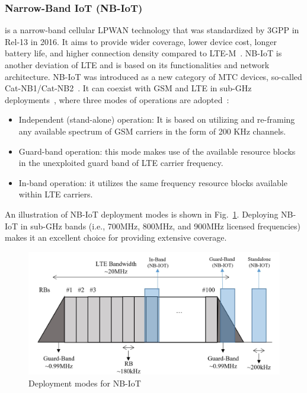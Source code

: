 \documentclass[]{IEEEtran}
\begin{document}
\subsubsection{Narrow-Band IoT (NB-IoT)}
\label{sec:2-2-1}
is a narrow-band cellular LPWAN technology that was standardized by 3GPP in Rel-13 in 2016\cite{TR_45.820}.
It aims to provide wider coverage, lower device cost, longer battery life, and higher connection density compared to LTE-M~\cite{ding_iot_2020}.
NB-IoT is another deviation of LTE and is based on its functionalities and network architecture.
NB-IoT was introduced as a new category of MTC devices, so-called Cat-NB1/Cat-NB2~\cite{liberg_cellular_2019}.
It can coexist with GSM and LTE in sub-GHz deployments~\cite{chaudhari2020lpwan}, where three modes of operations are adopted~\cite{chen2017narrow,chettri_comprehensive_2020_1}:
 \begin{itemize}
     \item Independent (stand-alone) operation: It is based on utilizing and re-framing any available spectrum of GSM carriers in the form of 200 KHz channels.
     \item Guard-band operation: this mode makes use of the available resource blocks in the unexploited guard band of LTE carrier frequency.
     \item In-band operation: it utilizes the same frequency resource blocks available within LTE carriers. 
 \end{itemize}
An illustration of NB-IoT deployment modes is shown in Fig.~\ref{fig:NB-IoT-deployments}.
Deploying NB-IoT in sub-GHz bands (i.e., 700MHz, 800MHz, and 900MHz licensed frequencies) makes it an excellent choice for providing extensive coverage. 
\begin{figure}
    \centering
        \includegraphics[width=\linewidth]{Pictures/Deployments supported by NB-IoT.png}
    \caption{Deployment modes for NB-IoT}
    \label{fig:NB-IoT-deployments}
\end{figure}
\end{document}
